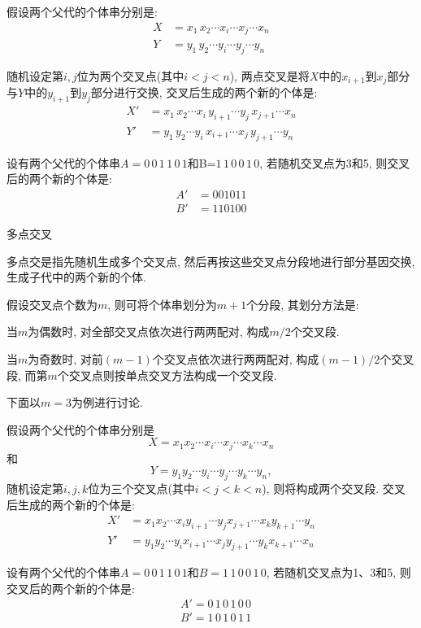 假设两个父代的个体串分别是:
\begin{align}
    X&=x_1\, x_2 \cdots x_i \cdots x_j \cdots x_n\\
    Y&=y_1\, y_2 \cdots y_i \cdots y_j \cdots y_n
\end{align}

随机设定第$i,j$位为两个交叉点(其中$i<j<n$), 两点交叉是将$X$中的$x_{i+1}$到$x_j$部分与$Y$中的$y_{i+1}$到$y_j$部分进行交换, 交叉后生成的两个新的个体是:
\begin{align}
  X'&= x_1\, x_2 \cdots x_i\, y_{i+1} \cdots y_j\, x_{j+1} \cdots x_n\\
  Y'&= y_1\, y_2  \cdots y_i\, x_{i+1} \cdots x_j\, y_{j+1} \cdots y_n
\end{align}

\begin{example}
设有两个父代的个体串$A= 0\, 0\,  1\,  1\,  0\,  1$和B=$1\,  1\,  0\,  0\,  1\,  0$, 若随机交叉点为3和5, 则交叉后的两个新的个体是:
\begin{align}
  A'&= 0 0 1 0 1 1\\
  B'&= 1 1 0 1 0 0
\end{align}
\end{example}

     多点交叉

多点交是指先随机生成多个交叉点, 然后再按这些交叉点分段地进行部分基因交换, 生成子代中的两个新的个体.

假设交叉点个数为$m$, 则可将个体串划分为$m+1$个分段, 其划分方法是:

当$m$为偶数时, 对全部交叉点依次进行两两配对, 构成$m/2$个交叉段.

当$m$为奇数时, 对前$(m-1)$个交叉点依次进行两两配对, 构成$(m-1)/2$个交叉段, 而第$m$个交叉点则按单点交叉方法构成一个交叉段.

下面以$m=3$为例进行讨论.

假设两个父代的个体串分别是$$X=x_1 x_2 \cdots x_i \cdots x_j \cdots x_k \cdots x_n$$和$$Y=y_1 y_2 \cdots y_i \cdots y_j \cdots y_k \cdots y_n,$$
随机设定第$i,j,k$位为三个交叉点(其中$i<j<k<n$), 则将构成两个交叉段. 交叉后生成的两个新的个体是:
\begin{align}
  X'&= x_1 x_2 \cdots x_i  y_{i+1} \cdots y_j x_{j+1} \cdots x_k y_{k+1} \cdots y_n\\
  Y'&= y_1 y_2 \cdots y_i x_{i+1} \cdots x_j y_{j+1} \cdots y_k x_{k+1} \cdots x_n
\end{align}
\begin{example}
设有两个父代的个体串$A= 0\, 0\, 1\, 1\, 0\, 1$和$B= 1\, 1\, 0\, 0\, 1\, 0$, 若随机交叉点为1、3和5, 则交叉后的两个新的个体是:
\begin{align}
   &A'= 0\, 1\, 0\, 1\, 0\, 0\\
   &B'= 1\, 0\, 1\, 0\, 1\, 1
\end{align}
\end{example}


